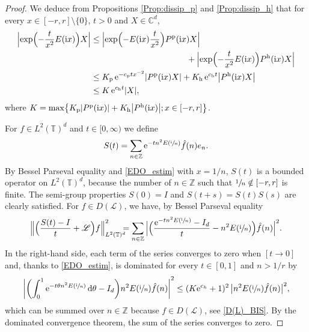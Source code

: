 \documentclass[JEP,XML,SOM,Unicode,NoEqCountersInSection]{cedram}
\let\mathcal\mathscr
\theoremstyle{plain}
\theoremstyle{definition}
\theoremstyle{remark}
\newcommand{\diff}[1][-3]{\ensuremath{\mathop{}\mkern#1mu\mathrm{d}}}
\newcommand{\set}{\mathbb}
\newcommand{\Z}{\set{Z}}
\renewcommand{\C}{\set{C}}
\newcommand{\T}{\set{T}}
\newcommand{\h}{{\mathrm h}}
\newcommand{\p}{{\mathrm p}}
\newcommand{\eu}{\mathrm e}
\newcommand{\iu}{\mathrm i}
\let\originalleft\left
\let\originalright\right
\renewcommand{\left}{\mathopen{}\mathclose\bgroup\originalleft}
\renewcommand{\right}{\aftergroup\egroup\originalright}
\begin{document}
\begin{proof}
We deduce from Propositions \ref{Prop:dissip_p} and \ref{Prop:dissip_h} that for every $x \in [-r,r]\setminus\{0\}$, $t> 0$ and $X \in \C^d$,
\begin{equation} \label{EDO_estim}
\begin{aligned}
\Bigl\lvert \exp\Bigl(-\frac{t}{x^2} E(\iu x) \Bigr) X \Bigl\rvert
& \leq
\Bigl\lvert \exp\Bigl(- E(\iu x) \frac{t}{x^2} \Bigr) P^\p(\iu x) X \Bigr\rvert\\
&\hspace*{4cm} +
\Bigl\lvert \exp\Bigl(- \frac{t}{x^2} E(\iu x) \Bigr) P^\h(\iu x) X \Bigr\rvert
\\ & \leq
K_\p\, \eu^{-c_\p tx^{-2}} \left\lvert P^\p(\iu x) X \right\rvert
+
K_\h\, \eu^{c_\h t} \left\lvert P^\h(\iu x) X \right\rvert
\\ & \leq
K\, \eu^{c_\h t} \left\lvert X \right\rvert,
\end{aligned}
\end{equation}
where $K=\max\left\{ K_\p \left\lvert P^\p(\iu x) \right\rvert
+ K_\h \left\lvert P^\h(\iu x) \right\rvert ; x \in [-r,r] \right\}$.

For $f \in L^2(\T)^d$ and $t\in[0,\infty)$ we define
\[
S(t)=\sum_{n\in\Z} \eu^{-tn^2 E\left(\sfrac{\iu}{n} \right)} \hat{f}(n) e_n.
\]
By Bessel Parseval equality and \eqref{EDO_estim} with $x=1/n$, $S(t)$ is a bounded operator on $L^2(\T)^d$, because the number of $n\in\Z$ such that $\sfrac{1}{n} \notin [-r,r]$ is finite.
The semi-group properties $S(0)=I$ and $S(t+s)=S(t) S(s)$ are clearly satisfied. For $f\in D(\mathcal{L})$, we have, by Bessel Parseval equality
\[
\Bigl\lVert \Bigl(\frac{S(t)-I}{t} + \mathcal{L} \Bigr)f \Bigr\rVert_{L^2(\T)^d}^2\mkern-12mu
=
\sum_{n\in\Z}\, \Bigl\lvert \Bigl(\dfrac{\eu^{-tn^2 E\left(\sfrac{\iu}{n} \right)}-I_d}{t} - n^2 E\left(\sfrac{\iu}{n}\right) \Bigr) \hat{f}(n)\Bigr\rvert^2.
\]
In the right-hand side, each term of the series converges to zero when $[t \to 0]$ and, thanks to \eqref{EDO_estim}, is dominated for every $t \in [0,1]$ and $n>1/r$ by
\[
\left\lvert
\left(\int_0^1 \eu^{-t\theta n^2 E\left(\sfrac{\iu}{n} \right)} \diff\theta - I_d \right) n^2 E\left(\sfrac{\iu}{n}\right) \hat{f}(n)\right\rvert^2 \leq (K \eu^{c_h} + 1)^2\,\bigl\lvert n^2 E\left(\sfrac{\iu}{n}\right) \hat{f}(n)\bigr\rvert^2,
\]
which can be summed over $n\in\Z$ because $f\in D(\mathcal{L})$, see \eqref{D(L)_BIS}.
By the dominated convergence theorem, the sum of the series converges to zero.
\end{proof}
\end{document}
